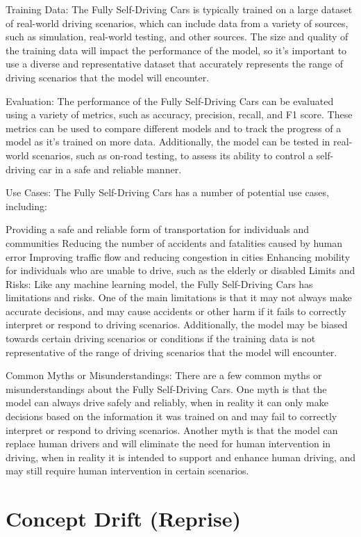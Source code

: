 Training Data:
The Fully Self-Driving Cars is typically trained on a large dataset of real-world driving scenarios, which can include data from a variety of sources, such as simulation, real-world testing, and other sources. The size and quality of the training data will impact the performance of the model, so it's important to use a diverse and representative dataset that accurately represents the range of driving scenarios that the model will encounter.

Evaluation:
The performance of the Fully Self-Driving Cars can be evaluated using a variety of metrics, such as accuracy, precision, recall, and F1 score. These metrics can be used to compare different models and to track the progress of a model as it's trained on more data. Additionally, the model can be tested in real-world scenarios, such as on-road testing, to assess its ability to control a self-driving car in a safe and reliable manner.

Use Cases:
The Fully Self-Driving Cars has a number of potential use cases, including:

Providing a safe and reliable form of transportation for individuals and communities
Reducing the number of accidents and fatalities caused by human error
Improving traffic flow and reducing congestion in cities
Enhancing mobility for individuals who are unable to drive, such as the elderly or disabled
Limits and Risks:
Like any machine learning model, the Fully Self-Driving Cars has limitations and risks. One of the main limitations is that it may not always make accurate decisions, and may cause accidents or other harm if it fails to correctly interpret or respond to driving scenarios. Additionally, the model may be biased towards certain driving scenarios or conditions if the training data is not representative of the range of driving scenarios that the model will encounter.

Common Myths or Misunderstandings:
There are a few common myths or misunderstandings about the Fully Self-Driving Cars. One myth is that the model can always drive safely and reliably, when in reality it can only make decisions based on the information it was trained on and may fail to correctly interpret or respond to driving scenarios. Another myth is that the model can replace human drivers and will eliminate the need for human intervention in driving, when in reality it is intended to support and enhance human driving, and may still require human intervention in certain scenarios.

\section{Concept Drift (Reprise)}


